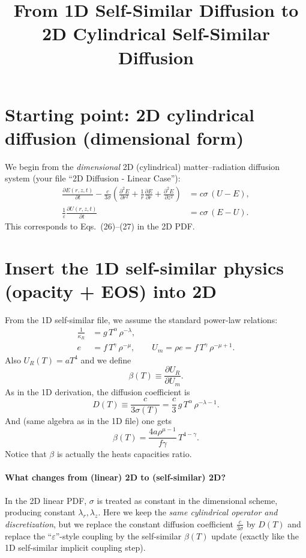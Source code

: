 \documentclass[11pt]{article}
\title{From 1D Self-Similar Diffusion to 2D Cylindrical Self-Similar Diffusion}
\author{}
\date{}
\begin{document}
\maketitle

\section{Starting point: 2D cylindrical diffusion (dimensional form)}
We begin from the \emph{dimensional} 2D (cylindrical) matter--radiation diffusion system (your file ``2D Diffusion - Linear Case''):
\begin{align}
\frac{\partial E(r,z,t)}{\partial t}
-\frac{c}{3\sigma}\left(
\frac{\partial^2 E}{\partial r^2}
+\frac{1}{r}\frac{\partial E}{\partial r}
+\frac{\partial^2 E}{\partial z^2}
\right)
&= c\sigma\,(U-E), \label{eq:2D_dim_E}\\
\frac{1}{\varepsilon}\frac{\partial U(r,z,t)}{\partial t}
&= c\sigma\,(E-U). \label{eq:2D_dim_U}
\end{align}
This corresponds to Eqs.~(26)--(27) in the 2D PDF.

\section{Insert the 1D self-similar physics (opacity + EOS) into 2D}
From the 1D self-similar file, we assume the standard power-law relations:
\begin{align}
\frac{1}{\kappa_R} &= g\,T^{\alpha}\,\rho^{-\lambda}, \label{eq:selfsim_kappa}\\
e &= f\,T^{\gamma}\,\rho^{-\mu}, \qquad U_m=\rho e = f\,T^{\gamma}\,\rho^{-\mu+1}. \label{eq:selfsim_e}
\end{align}
Also $U_R(T)=aT^4$ and we define
\begin{equation}
\beta(T)\equiv \frac{\partial U_R}{\partial U_m}. \label{eq:beta_def}
\end{equation}
As in the 1D derivation, the diffusion coefficient is
\begin{equation}
D(T)\equiv \frac{c}{3\sigma(T)}
=\frac{c}{3}\,g\,T^{\alpha}\,\rho^{-\lambda-1}. \label{eq:D_of_T}
\end{equation}
And (same algebra as in the 1D file) one gets
\begin{equation}
\beta(T)=\frac{4a\rho^{\mu-1}}{f\gamma}\,T^{4-\gamma}. \label{eq:beta_of_T}
\end{equation}
Notice that $\beta$ is actually the heats capacities ratio. 

\paragraph{What changes from (linear) 2D to (self-similar) 2D?}
In the 2D linear PDF, $\sigma$ is treated as constant in the dimensional scheme, producing constant $\lambda_r,\lambda_z$.
Here we keep the \emph{same cylindrical operator and discretization}, but we replace the constant diffusion coefficient
$\frac{c}{3\sigma}$ by $D(T)$ and replace the ``$\varepsilon$''-style coupling by the self-similar $\beta(T)$ update (exactly like the 1D self-similar implicit coupling step).
\end{document}
